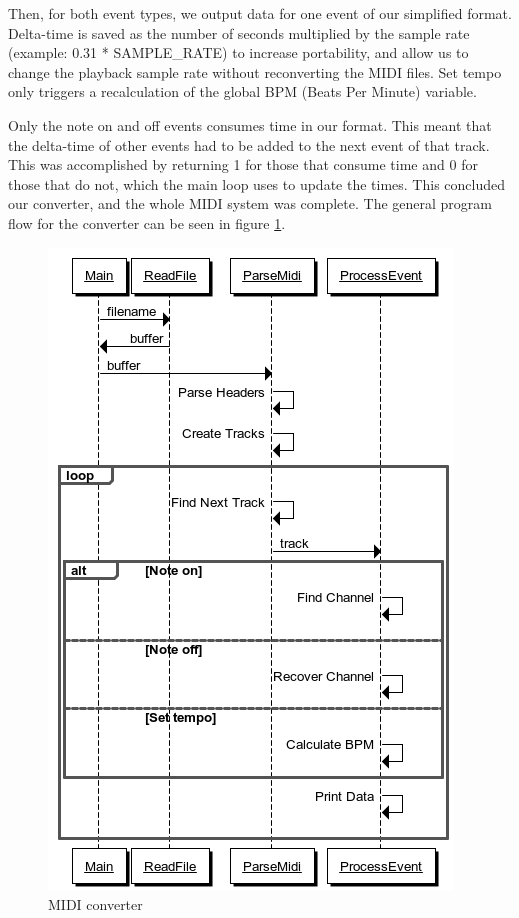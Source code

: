 \documentclass[a4paper,12pt]{article}
\begin{document}
Then, for both event types, we output data for one event of our simplified format. Delta-time is saved as the number of seconds multiplied by the sample rate (example: 0.31 * SAMPLE\_RATE) to increase portability, and allow us to change the playback sample rate without reconverting the MIDI files. Set tempo only triggers a recalculation of the global BPM (Beats Per Minute) variable.

Only the note on and off events consumes time in our format. This meant that the delta-time of other events had to be added to the next event of that track. This was accomplished by returning 1 for those that consume time and 0 for those that do not, which the main loop uses to update the times. This concluded our converter, and the whole MIDI system was complete. The general program flow for the converter can be seen in figure \ref{midi2c}.

\begin{figure}[b]
        \centering
            \includegraphics[width=\textwidth]{midi2c}
            \caption{MIDI converter}
            \label{midi2c}
\end{figure}
\end{document}
